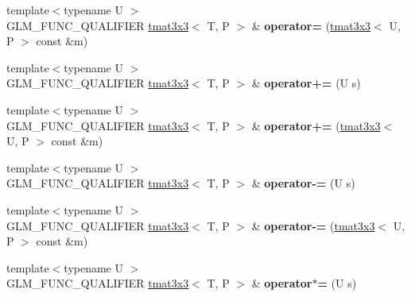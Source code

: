 \begin{DoxyCompactItemize}
\item 
{\footnotesize template$<$typename U $>$ }\\G\+L\+M\+\_\+\+F\+U\+N\+C\+\_\+\+Q\+U\+A\+L\+I\+F\+I\+ER \hyperlink{structglm_1_1detail_1_1tmat3x3}{tmat3x3}$<$ T, P $>$ \& {\bfseries operator=} (\hyperlink{structglm_1_1detail_1_1tmat3x3}{tmat3x3}$<$ U, P $>$ const \&m)\hypertarget{structglm_1_1detail_1_1tmat3x3_a460c6e70ac10a60f30d800146e65f1ba}{}\label{structglm_1_1detail_1_1tmat3x3_a460c6e70ac10a60f30d800146e65f1ba}

\item 
{\footnotesize template$<$typename U $>$ }\\G\+L\+M\+\_\+\+F\+U\+N\+C\+\_\+\+Q\+U\+A\+L\+I\+F\+I\+ER \hyperlink{structglm_1_1detail_1_1tmat3x3}{tmat3x3}$<$ T, P $>$ \& {\bfseries operator+=} (U s)\hypertarget{structglm_1_1detail_1_1tmat3x3_a5e6d2e421fbd009d27051c5bc8a6c487}{}\label{structglm_1_1detail_1_1tmat3x3_a5e6d2e421fbd009d27051c5bc8a6c487}

\item 
{\footnotesize template$<$typename U $>$ }\\G\+L\+M\+\_\+\+F\+U\+N\+C\+\_\+\+Q\+U\+A\+L\+I\+F\+I\+ER \hyperlink{structglm_1_1detail_1_1tmat3x3}{tmat3x3}$<$ T, P $>$ \& {\bfseries operator+=} (\hyperlink{structglm_1_1detail_1_1tmat3x3}{tmat3x3}$<$ U, P $>$ const \&m)\hypertarget{structglm_1_1detail_1_1tmat3x3_ac54fab49afb79333e8471a7986fe97b0}{}\label{structglm_1_1detail_1_1tmat3x3_ac54fab49afb79333e8471a7986fe97b0}

\item 
{\footnotesize template$<$typename U $>$ }\\G\+L\+M\+\_\+\+F\+U\+N\+C\+\_\+\+Q\+U\+A\+L\+I\+F\+I\+ER \hyperlink{structglm_1_1detail_1_1tmat3x3}{tmat3x3}$<$ T, P $>$ \& {\bfseries operator-\/=} (U s)\hypertarget{structglm_1_1detail_1_1tmat3x3_a8571cd3a69ca0d1f25d17a724e730c07}{}\label{structglm_1_1detail_1_1tmat3x3_a8571cd3a69ca0d1f25d17a724e730c07}

\item 
{\footnotesize template$<$typename U $>$ }\\G\+L\+M\+\_\+\+F\+U\+N\+C\+\_\+\+Q\+U\+A\+L\+I\+F\+I\+ER \hyperlink{structglm_1_1detail_1_1tmat3x3}{tmat3x3}$<$ T, P $>$ \& {\bfseries operator-\/=} (\hyperlink{structglm_1_1detail_1_1tmat3x3}{tmat3x3}$<$ U, P $>$ const \&m)\hypertarget{structglm_1_1detail_1_1tmat3x3_aee1a83177bbf6078a9d2ef4f753dccb4}{}\label{structglm_1_1detail_1_1tmat3x3_aee1a83177bbf6078a9d2ef4f753dccb4}

\item 
{\footnotesize template$<$typename U $>$ }\\G\+L\+M\+\_\+\+F\+U\+N\+C\+\_\+\+Q\+U\+A\+L\+I\+F\+I\+ER \hyperlink{structglm_1_1detail_1_1tmat3x3}{tmat3x3}$<$ T, P $>$ \& {\bfseries operator$\ast$=} (U s)\hypertarget{structglm_1_1detail_1_1tmat3x3_a3340b55021366a2f8bbed8299416bfdb}{}\label{structglm_1_1detail_1_1tmat3x3_a3340b55021366a2f8bbed8299416bfdb}


\end{DoxyCompactItemize}
